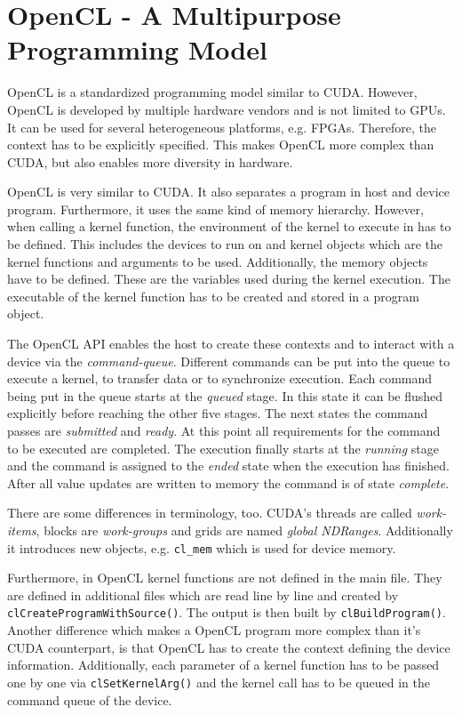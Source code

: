 \section{OpenCL - A Multipurpose Programming Model}
  OpenCL is a standardized programming model similar to CUDA.
  However, OpenCL is developed by multiple hardware vendors and is not limited to GPUs.
  It can be used for several heterogeneous platforms, e.g. FPGAs.
  Therefore, the context has to be explicitly specified.
  This makes OpenCL more complex than CUDA, but also enables more diversity in hardware.~\cite{Rauber.2012}

  OpenCL is very similar to CUDA.
  It also separates a program in host and device program.
  Furthermore, it uses the same kind of memory hierarchy.
  However, when calling a kernel function, the environment of the kernel to execute in has to be defined.
  This includes the devices to run on and kernel objects which are the kernel functions and arguments to be used.
  Additionally, the memory objects have to be defined.
  These are the variables used during the kernel execution.
  The executable of the kernel function has to be created and stored in a program object.~\cite{Khronos.2019}
  
  
  The OpenCL API enables the host to create these contexts and to interact with a device via the \textit{command-queue}.
  Different commands can be put into the queue to execute a kernel, to transfer data or to synchronize execution.
  Each command being put in the queue starts at the \textit{queued} stage.
  In this state it can be flushed explicitly before reaching the other five stages.
  The next states the command passes are \textit{submitted} and \textit{ready}.
  At this point all requirements for the command to be executed are completed.
  The execution finally starts at the \textit{running} stage and the command is assigned to the \textit{ended} state when the execution has finished.
  After all value updates are written to memory the command is of state \textit{complete}.
    
  There are some differences in terminology, too.
  CUDA's threads are called \textit{work-items}, blocks are \textit{work-groups} and grids are named \textit{global NDRanges}.
  Additionally it introduces new objects, e.g. \texttt{cl\_mem} which is used for device memory.
    
  Furthermore, in OpenCL kernel functions are not defined in the main file.
  They are defined in additional files which are read line by line and created by \texttt{clCreateProgramWithSource()}.
  The output is then built by \texttt{clBuildProgram()}.
  Another difference which makes a OpenCL program more complex than it's CUDA counterpart, is that OpenCL has to create the context defining the device information.
  Additionally, each parameter of a kernel function has to be passed one by one via \texttt{clSetKernelArg()} and the kernel call has to be queued in the command queue of the device.
